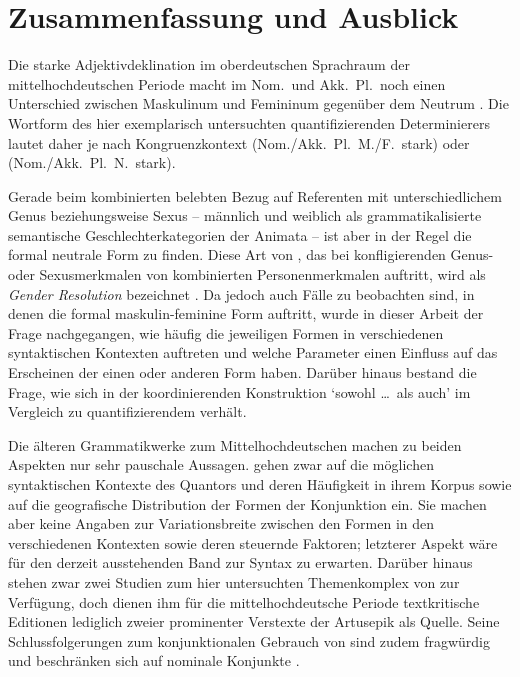 \chapter{Zusammenfassung und Ausblick}
\label{ch:zusammenfassung}

Die starke Adjektivdeklination im oberdeutschen Sprachraum der
mittelhochdeutschen Periode macht im Nom.\ und Akk.\ Pl.\ noch einen
Unterschied zwischen Maskulinum und Femininum gegenüber dem Neutrum
\autocite[182]{ksw2}. Die Wortform des hier exemplarisch untersuchten
quantifizierenden Determinierers  lautet daher je nach
Kongruenzkontext  (Nom./Akk.\ Pl.\ M./F.\ stark) oder 
(Nom./Akk.\ Pl.\ N.\ stark).

Gerade beim kombinierten belebten Bezug auf Referenten mit unterschiedlichem
Genus beziehungsweise Sexus -- männlich und weiblich als grammatikalisierte
semantische Geschlechterkategorien der Animata -- ist aber in der Regel die
formal neutrale Form zu finden. Diese Art von , das bei
konfligierenden Genus- oder Sexusmerkmalen von kombinierten Personenmerkmalen
auftritt, wird als \textit{Gender Resolution} bezeichnet
\autocites{corbett1983}[264--306]{corbett1991}. Da jedoch auch Fälle zu
beobachten sind, in denen die formal maskulin-feminine Form auftritt, wurde in
dieser Arbeit der Frage nachgegangen, wie häufig die jeweiligen Formen in
verschiedenen syntaktischen Kontexten auftreten und welche Parameter einen
Einfluss auf das Erscheinen der einen oder anderen Form haben. Darüber hinaus
bestand die Frage, wie sich  in der koordinierenden
Konstruktion  `sowohl \dots\ als auch' im
Vergleich zu quantifizierendem  verhält.

Die älteren Grammatikwerke zum Mittelhochdeutschen
\autocites[384]{paul2007}[187--189, 222]{dal2014}[258]{michels1979}%
[221]{mettke2000} machen zu beiden Aspekten nur sehr pauschale Aussagen.
\citet[621--628]{ksw2} gehen zwar auf die möglichen syntaktischen Kontexte des
Quantors  und deren Häufigkeit in ihrem Korpus sowie auf die
geografische Distribution der Formen der Konjunktion  ein. Sie
machen aber keine Angaben zur Variationsbreite zwischen den Formen in den
verschiedenen Kontexten sowie deren steuernde Faktoren; letzterer Aspekt wäre
für den derzeit ausstehenden Band zur Syntax zu erwarten. Darüber hinaus stehen
zwar zwei Studien zum hier untersuchten Themenkomplex von
\citet{askedal1973,askedal1974} zur Verfügung, doch dienen ihm für die
mittelhochdeutsche Periode textkritische Editionen lediglich zweier
prominenter Verstexte der Artusepik als Quelle. Seine Schlussfolgerungen zum
konjunktionalen Gebrauch von  \autocite{askedal1974} sind zudem
fragwürdig und beschränken sich auf nominale Konjunkte \autocite{gjelsten1980}.

